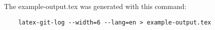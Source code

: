 \documentclass[12pt,a4paper,english]{scrartcl}
\begin{document}


The example-output.tex was generated with this command:
\begin{verbatim}
	latex-git-log --width=6 --lang=en > example-output.tex
\end{verbatim}
\end{document}
